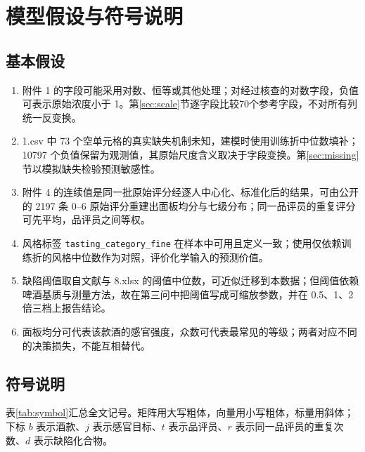 \section{模型假设与符号说明}

\subsection{基本假设}

\begin{enumerate}
\item[\textbf{A1}] 附件 1 的字段可能采用对数、恒等或其他处理；对经过核查的对数字段，负值可表示原始浓度小于 1。第\ref{sec:scale}节逐字段比较70个参考字段，不对所有列统一反变换。
\item[\textbf{A2}] 1.csv 中 73 个空单元格的真实缺失机制未知，建模时使用训练折中位数填补；10797 个负值保留为观测值，其原始尺度含义取决于字段变换。第\ref{sec:missing}节以模拟缺失检验预测敏感性。
\item[\textbf{A3}] 附件 4 的连续值是同一批原始评分经逐人中心化、标准化后的结果，可由公开的 2197 条 0--6 原始评分重建出面板均分与七级分布；同一品评员的重复评分可先平均，品评员之间等权。
\item[\textbf{A4}] 风格标签 \texttt{tasting\_category\_fine} 在样本中可用且定义一致；使用仅依赖训练折的风格中位数作为对照，评价化学输入的预测价值。
\item[\textbf{A5}] 缺陷阈值取自文献与 8.xlsx 的阈值中位数，可近似迁移到本数据；但阈值依赖啤酒基质与测量方法，故在第三问中把阈值写成可缩放参数，并在 0.5、1、2 倍三档上报告结论。
\item[\textbf{A6}] 面板均分可代表该款酒的感官强度，众数可代表最常见的等级；两者对应不同的决策损失，不能互相替代。
\end{enumerate}

\subsection{符号说明}

表\ref{tab:symbol}汇总全文记号。矩阵用大写粗体，向量用小写粗体，标量用斜体；下标 $b$ 表示酒款、$j$ 表示感官目标、$t$ 表示品评员、$r$ 表示同一品评员的重复次数、$d$ 表示缺陷化合物。

